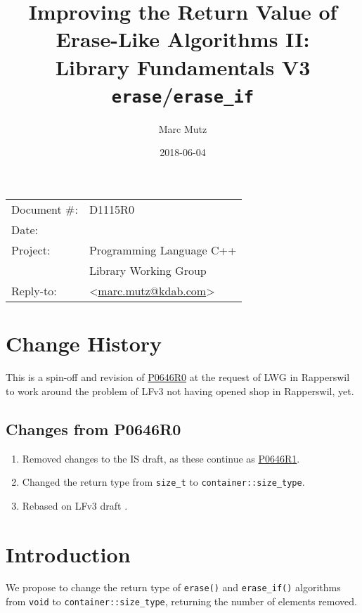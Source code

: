 \documentclass[11pt]{article}
\date{}
\title{Improving the Return Value of Erase-Like Algorithms II:\\ Library
  Fundamentals V3 \texttt{erase}/\texttt{erase\_if}}
\makeatletter
\newcommand{\emailaddress}{marc.mutz@kdab.com}
\newcommand{\email}{\href{mailto:\emailaddress}{\emailaddress}}
\newcommand{\wgpaper}[1]{\href{https://wg21.link/#1}{#1}}
\makeatother
\begin{document}
\maketitle\vspace{-2cm}

\begin{flushright}
  \begin{tabular}{ll}
  Document \#:&D1115R0\\
  Date:       &\date{2018-06-04}\\
  Project:    &Programming Language C++\\
              &Library Working Group\\
  Reply-to:   &\author{Marc Mutz} \textless\email\textgreater
  \end{tabular}
\end{flushright}

\section{Change History}

This is a spin-off and revision of \wgpaper{P0646R0} at the request of
LWG in Rapperswil to work around the problem of LFv3 not having opened
shop in Rapperswil, yet.

\subsection{Changes from P0646R0}

\begin{enumerate}
\item Removed changes to the IS draft, as these continue as
  \wgpaper{P0646R1}.
\item Changed the return type from \texttt{size\_t} to
  \texttt{container::size\_type}.
\item Rebased on LFv3 draft \cite{LFv3}.
\end{enumerate}

\section{Introduction}

We propose to change the return type of \cite{LFv3} \texttt{erase()}
and \texttt{erase\_if()} algorithms from \texttt{void} to
\texttt{container::size\_type}, returning the number of elements removed.
\end{document}
